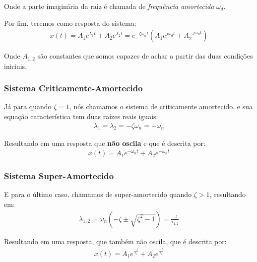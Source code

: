 \documentclass{article}
\begin{document}
                    Onde a parte imaginária da raiz é chamada de \emph{frequência amortecida} $\omega_d$. 

                    Por fim, teremos como resposta do sistema:
                    \begin{align}
                        x(t) = A_1 e^{\lambda_1 t} + A_2 e^{\lambda_2 t} = e^{-\zeta \omega_n t}(A_1e^{j\omega_dt} + A_2^{-j\omega_d t}) \label{eq:resp_sis_sub_amortecido}
                    \end{align}

                    Onde $A_{1,2}$ são constantes que somos capazes de achar a partir das duas condições iniciais.

                \subsubsection{Sistema Criticamente-Amortecido}
                    Já para quando $\zeta=1$, nós chamamos o sistema de criticamente amortecido, e sua equação característica tem duas raízes reais iguais:
                    \begin{align}
                        \lambda_1 = \lambda_2 = -\zeta \omega_n = -\omega_n \label{eq:raizes_caso_criticamente_amortecido}
                    \end{align}

                     Resultando em uma resposta que \textbf{não oscila} e que é descrita por:
                     \begin{align}
                        x(t) = A_1 e^{-\omega_n t}  + A_2 e^{-\omega_n t}
                     \end{align}

                \subsubsection{Sistema Super-Amortecido}
                     E para o último caso, chamamos de super-amortecido quando $\zeta > 1$, resultando em:
                     \begin{align}
                        \lambda_{1,2} = \omega_n\left(-\zeta\pm \sqrt{\zeta^2 - 1}\right) = \frac{-1}{\tau_{1,2}}
                     \end{align}

                     Resultando em uma resposta, que também não oscila, que é descrita por:
                     \begin{align}
                        x(t) = A_1e^{\frac{-t}{\tau_1}} + A_2e^{\frac{-t}{\tau_2}}
                     \end{align}
\end{document}
